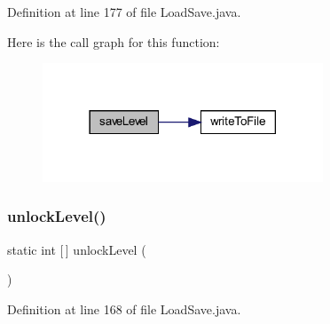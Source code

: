 Definition at line 177 of file Load\+Save.\+java.

Here is the call graph for this function\+:
\nopagebreak
\begin{figure}[H]
\begin{center}
\leavevmode
\includegraphics[width=237pt]{classhelpz_1_1_load_save_a518631414c15c47704a28422e8fbdc33_cgraph}
\end{center}
\end{figure}
\mbox{\label{classhelpz_1_1_load_save_a1369888f20d8279b649d556082d38e72}} 
\subsubsection{\texorpdfstring{unlock\+Level()}{unlockLevel()}}
{\footnotesize\ttfamily static int \mbox{[}$\,$\mbox{]} unlock\+Level (\begin{DoxyParamCaption}{ }\end{DoxyParamCaption})\hspace{0.3cm}{\ttfamily [static]}}



Definition at line 168 of file Load\+Save.\+java.

